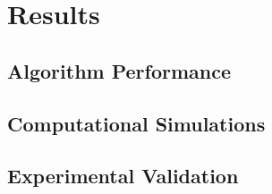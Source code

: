 \chapter{Results}



\lipsum[1-2]

\section{Algorithm Performance}


\lipsum[1-3]

\section{Computational Simulations}



\lipsum[1-6]

\section{Experimental Validation}


\lipsum[1-6]


%
%
%
%
%
%
%
